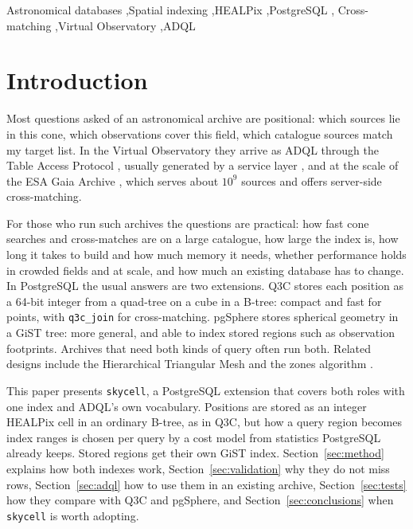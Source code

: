 \documentclass[preprint,12pt]{elsarticle}
\newcommand{\Sect}{Section}
\begin{document}
\begin{frontmatter}
\begin{keyword}
Astronomical databases \sep Spatial indexing \sep HEALPix \sep PostgreSQL \sep
Cross-matching \sep Virtual Observatory \sep ADQL
\end{keyword}

\end{frontmatter}

\makeatletter
{}
\makeatother

\section{Introduction}

Most questions asked of an astronomical archive are positional: which sources lie in
this cone, which observations cover this field, which catalogue sources match my target
list. In the Virtual Observatory they arrive as ADQL \citep{adql}
through the Table Access Protocol \citep{tap}, usually generated by a service layer
\citep[e.g.][]{dachs}, and at the scale of the ESA Gaia Archive
\citep{gaiaarchive1, gaiaarchive2}, which serves about $10^9$ sources and offers
server-side cross-matching.

For those who run such archives the questions are practical: how fast cone searches
and cross-matches are on a large catalogue, how large the index is, how long it takes to
build and how much memory it needs, whether performance holds in crowded fields and at
scale, and how much an existing database has to change. In PostgreSQL the usual answers
are two extensions. Q3C
\citep{q3c} stores each position as a 64-bit integer from a quad-tree on a cube in a
B-tree: compact and fast for points, with \texttt{q3c\_join} for cross-matching.
pgSphere \citep{pgsphere} stores spherical geometry in a GiST tree: more general, and
able to index stored regions such as observation footprints. Archives that need both kinds of query often run both. Related designs
include the Hierarchical Triangular Mesh \citep{htm} and the zones algorithm
\citep{zones}.

This paper presents \texttt{skycell}, a PostgreSQL extension that covers both roles
with one index and ADQL's own vocabulary. Positions are stored as an integer HEALPix cell
in an ordinary B-tree, as in Q3C, but how a query region becomes index ranges is chosen
per query by a cost model from statistics PostgreSQL already keeps. Stored regions get
their own GiST index. \Sect~\ref{sec:method} explains how
both indexes work, \Sect~\ref{sec:validation} why they do not miss rows,
\Sect~\ref{sec:adql} how to use them in an existing archive, \Sect~\ref{sec:tests}
how they compare with Q3C and pgSphere, and \Sect~\ref{sec:conclusions} when
\texttt{skycell} is worth adopting.
\end{document}
